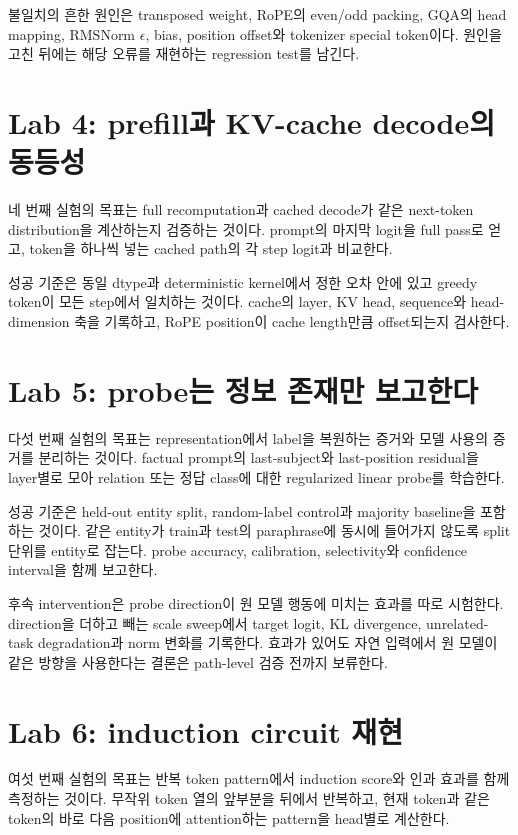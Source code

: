 불일치의 흔한 원인은 transposed weight, RoPE의 even/odd packing, GQA의 head mapping, RMSNorm $\epsilon$, bias, position offset와 tokenizer special token이다.
원인을 고친 뒤에는 해당 오류를 재현하는 regression test를 남긴다.

\section{Lab 4: prefill과 KV-cache decode의 동등성}

네 번째 실험의 목표는 full recomputation과 cached decode가 같은 next-token distribution을 계산하는지 검증하는 것이다.
prompt의 마지막 logit을 full pass로 얻고, token을 하나씩 넣는 cached path의 각 step logit과 비교한다.

성공 기준은 동일 dtype과 deterministic kernel에서 정한 오차 안에 있고 greedy token이 모든 step에서 일치하는 것이다.
cache의 layer, KV head, sequence와 head-dimension 축을 기록하고, RoPE position이 cache length만큼 offset되는지 검사한다.

\section{Lab 5: probe는 정보 존재만 보고한다}

다섯 번째 실험의 목표는 representation에서 label을 복원하는 증거와 모델 사용의 증거를 분리하는 것이다.
factual prompt의 last-subject와 last-position residual을 layer별로 모아 relation 또는 정답 class에 대한 regularized linear probe를 학습한다.

성공 기준은 held-out entity split, random-label control과 majority baseline을 포함하는 것이다.
같은 entity가 train과 test의 paraphrase에 동시에 들어가지 않도록 split 단위를 entity로 잡는다.
probe accuracy, calibration, selectivity와 confidence interval을 함께 보고한다.

후속 intervention은 probe direction이 원 모델 행동에 미치는 효과를 따로 시험한다.
direction을 더하고 빼는 scale sweep에서 target logit, KL divergence, unrelated-task degradation과 norm 변화를 기록한다.
효과가 있어도 자연 입력에서 원 모델이 같은 방향을 사용한다는 결론은 path-level 검증 전까지 보류한다.

\section{Lab 6: induction circuit 재현}

여섯 번째 실험의 목표는 반복 token pattern에서 induction score와 인과 효과를 함께 측정하는 것이다.
무작위 token 열의 앞부분을 뒤에서 반복하고, 현재 token과 같은 token의 바로 다음 position에 attention하는 pattern을 head별로 계산한다.


